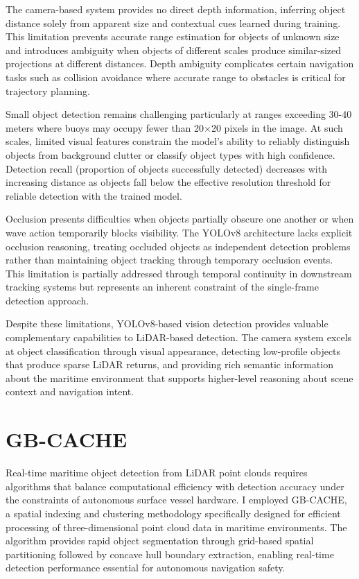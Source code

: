 \documentclass{erauthesis}
\begin{document}
The camera-based system provides no direct depth information, inferring object distance solely from apparent size and contextual cues learned during training.
This limitation prevents accurate range estimation for objects of unknown size and introduces ambiguity when objects of different scales produce similar-sized projections at different distances.
Depth ambiguity complicates certain navigation tasks such as collision avoidance where accurate range to obstacles is critical for trajectory planning.

Small object detection remains challenging particularly at ranges exceeding 30-40 meters where buoys may occupy fewer than 20×20 pixels in the image.
At such scales, limited visual features constrain the model's ability to reliably distinguish objects from background clutter or classify object types with high confidence.
Detection recall (proportion of objects successfully detected) decreases with increasing distance as objects fall below the effective resolution threshold for reliable detection with the trained model.

Occlusion presents difficulties when objects partially obscure one another or when wave action temporarily blocks visibility.
The YOLOv8 architecture lacks explicit occlusion reasoning, treating occluded objects as independent detection problems rather than maintaining object tracking through temporary occlusion events.
This limitation is partially addressed through temporal continuity in downstream tracking systems but represents an inherent constraint of the single-frame detection approach.

Despite these limitations, YOLOv8-based vision detection provides valuable complementary capabilities to \ac{LiDAR}-based detection.
The camera system excels at object classification through visual appearance, detecting low-profile objects that produce sparse \ac{LiDAR} returns, and providing rich semantic information about the maritime environment that supports higher-level reasoning about scene context and navigation intent.


\section{GB-CACHE} \label{gbcache}

Real-time maritime object detection from \ac{LiDAR} point clouds requires algorithms that balance computational efficiency with detection accuracy under the constraints of autonomous surface vessel hardware.
I employed \ac{GB-CACHE}, a spatial indexing and clustering methodology specifically designed for efficient processing of three-dimensional point cloud data in maritime environments.
The algorithm provides rapid object segmentation through grid-based spatial partitioning followed by concave hull boundary extraction, enabling real-time detection performance essential for autonomous navigation safety.
\end{document}
